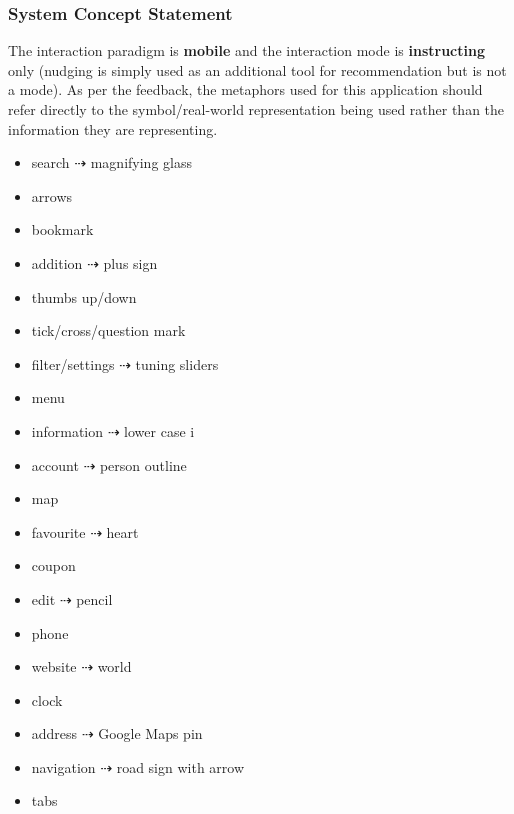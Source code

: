 \documentclass[a4 paper, 12pt]{article}
\begin{document}
        \subsubsection{System Concept Statement}
        The interaction paradigm is \textbf{mobile} and the interaction mode is \textbf{instructing} only (nudging is simply used as an additional tool for recommendation but is not a mode). As per the feedback, the metaphors used for this application should refer directly to the symbol/real-world representation being used rather than the information they are representing.  
            \begin{multicols}{2}
                \begin{itemize}
                    \item search $\dashrightarrow$ magnifying glass
                    \item arrows 
                    \item bookmark 
                    \item addition $\dashrightarrow$ plus sign
                    \item thumbs up/down 
                    \item tick/cross/question mark 
                    \item filter/settings $\dashrightarrow$ tuning sliders 
                    \item menu
                    \item information $\dashrightarrow$ lower case i 
                    \item account $\dashrightarrow$ person outline 
                    \item map 
                    \item favourite $\dashrightarrow$ heart 
                    \item coupon
                    \item edit $\dashrightarrow$ pencil
                    \item phone
                    \item website $\dashrightarrow$ world
                    \item clock
                    \item address $\dashrightarrow$ Google Maps pin
                    \item navigation $\dashrightarrow$ road sign with arrow
                    \item tabs
                \end{itemize}
            \end{multicols}
\end{document}
